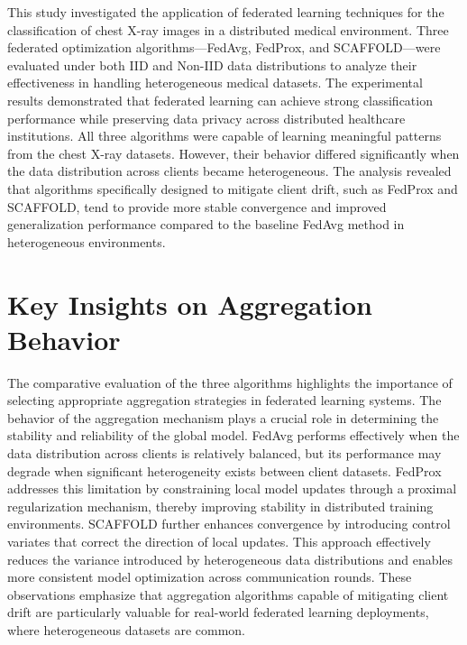 \documentclass[12pt]{book}
\begin{document}
This study investigated the application of federated learning techniques for the classification of chest X-ray images in a distributed medical environment. Three federated optimization algorithms—FedAvg, FedProx, and SCAFFOLD—were evaluated under both IID and Non-IID data distributions to analyze their effectiveness in handling heterogeneous medical datasets.
The experimental results demonstrated that federated learning can achieve strong classification performance while preserving data privacy across distributed healthcare institutions. All three algorithms were capable of learning meaningful patterns from the chest X-ray datasets. However, their behavior differed significantly when the data distribution across clients became heterogeneous.
The analysis revealed that algorithms specifically designed to mitigate client drift, such as FedProx and SCAFFOLD, tend to provide more stable convergence and improved generalization performance compared to the baseline FedAvg method in heterogeneous environments.


\section{Key Insights on Aggregation Behavior}

The comparative evaluation of the three algorithms highlights the importance of selecting appropriate aggregation strategies in federated learning systems. The behavior of the aggregation mechanism plays a crucial role in determining the stability and reliability of the global model.
FedAvg performs effectively when the data distribution across clients is relatively balanced, but its performance may degrade when significant heterogeneity exists between client datasets. FedProx addresses this limitation by constraining local model updates through a proximal regularization mechanism, thereby improving stability in distributed training environments.
SCAFFOLD further enhances convergence by introducing control variates that correct the direction of local updates. This approach effectively reduces the variance introduced by heterogeneous data distributions and enables more consistent model optimization across communication rounds.
These observations emphasize that aggregation algorithms capable of mitigating client drift are particularly valuable for real-world federated learning deployments, where heterogeneous datasets are common.
\end{document}
